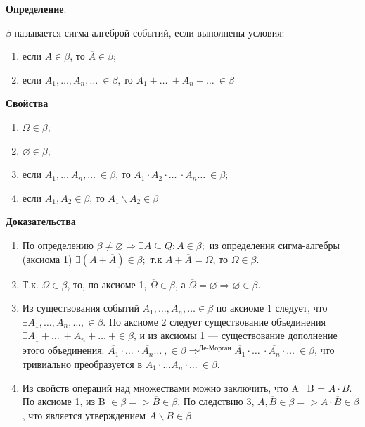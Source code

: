 \textbf{Определение}. 

$\beta$ называется сигма-алгеброй событий, если выполнены условия: 
\begin{enumerate}
	\item если $A \in \beta$, то $\overline{A} \in \beta$;
	\item если $A_1, \dots, A_n, \dots\ \in \beta$, то $A_1 + \dots\ + A_n + \dots\ \in \beta$
\end{enumerate}

\textbf{Свойства}

\begin{enumerate}
	
	\item $\Omega \in \beta$;
	\item $\varnothing \in \beta$;
	\item если $A_1, \dots\ A_n, \dots\ \in \beta$, то $A_1 \cdot A_2 \cdot \dots\ \cdot A_n \dots\  \in \beta$;
	\item если $A_1, A_2 \in \beta$, то $A_1 \backslash A_2 \in \beta$
\end{enumerate}


\textbf{Доказательства}

\begin{enumerate}
	\item По определению $\beta \neq \varnothing \Rightarrow \exists A \subseteq Q: A \in \beta;$ из определения сигма-алгебры (аксиома 1) $\exists (A + \overline{A}) \in \beta;$ т.к $A + \overline{A} = \Omega$, то $\Omega \in \beta$.
	\item Т.к. $\Omega \in \beta$, то, по аксиоме 1, $\overline{\Omega} \in \beta$, а $\overline{\Omega} = \varnothing \Rightarrow \varnothing \in \beta$. 
	\item Из существования событий $A_1, \dots, A_n, \dots \in \beta$ по аксиоме 1 следует, что $\exists \overline{A_1}, \dots, \overline{A_n}, \dots, \in \beta$. По аксиоме 2 следует существование объединения $\exists \overline{A_1} + \dots\ + \overline{A_n} +  \dots\ + \in \beta$, и из аксиомы 1 --- существование дополнение этого объединения: $\overline{\overline{A_1} \cdot \dots\ \cdot \overline{A_n} \dots\ }, \in \beta \Rightarrow^{\text{Де-Морган}} \overline{\overline{A_1}} \cdot \dots\ \cdot \overline{\overline{A_n}} \cdot \dots\  \in \beta$, что тривиально преобразуется в $A_1 \cdot \dots  A_n \cdot \dots\  \in \beta$.
	
	\item Из свойств операций над множествами можно заключить, что A \ B = $A \cdot \overline{B}.$ По аксиоме 1, из B $\in \beta => \overline{B} \in \beta$. По следствию 3, $A, \overline{B} \in \beta => A \cdot \overline{B} \in \beta$, что является утверждением $A \backslash B \in \beta$ 
\end{enumerate}


